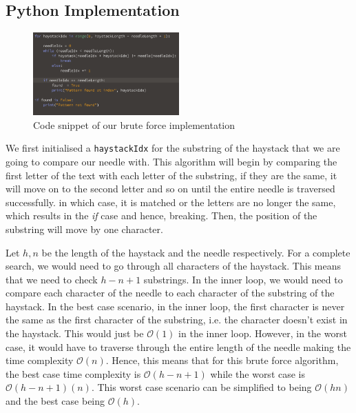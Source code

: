 \subsection*{Python Implementation}

\begin{figure}[h!]
    \centering
    \includegraphics[width=0.50\textwidth]{images/brute_force.png}
    \caption{Code snippet of our brute force implementation}
    \label{fig:bf_code}
\end{figure}

We first initialised a \texttt{haystackIdx} for the substring of the haystack that we are going to compare our needle with. This algorithm will begin by comparing the first letter of the text with each letter of the substring, if they are the same, it will move on to the second letter and so on until the entire needle is traversed successfully. in which case, it is matched or the letters are no longer the same, which results in the \emph{if} case and hence, breaking. Then, the position of the substring will move by one character.

Let $h, n$ be the length of the haystack and the needle respectively. For a complete search, we would need to go through all characters of the haystack. This means that we need to check $h - n + 1$ substrings. In the inner loop, we would need to compare each character of the needle to each character of the substring of the haystack. In the best case scenario, in the inner loop, the first character is never the same as the first character of the substring, i.e. the character doesn't exist in the haystack. This would just be $\mathcal{O}(1)$ in the inner loop. However, in the worst case, it would have to traverse through the entire length of the needle making the time complexity $\mathcal{O}(n)$. Hence, this means that for this brute force algorithm, the best case time complexity is $\mathcal{O}(h - n + 1)$ while the worst case is $\mathcal{O}(h - n + 1)(n)$. This worst case scenario can be simplified to being $\mathcal{O}(hn)$ and the best case being $\mathcal{O}(h)$. \\

